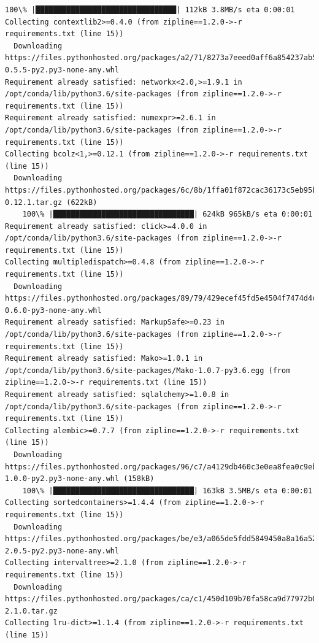 \documentclass[11pt]{article}
\begin{document}
\begin{Verbatim}[commandchars=\\\{\}]
    100\% |████████████████████████████████| 112kB 3.8MB/s eta 0:00:01
Collecting contextlib2>=0.4.0 (from zipline==1.2.0->-r requirements.txt (line 15))
  Downloading https://files.pythonhosted.org/packages/a2/71/8273a7eeed0aff6a854237ab5453bc9aa67deb49df4832801c21f0ff3782/contextlib2-0.5.5-py2.py3-none-any.whl
Requirement already satisfied: networkx<2.0,>=1.9.1 in /opt/conda/lib/python3.6/site-packages (from zipline==1.2.0->-r requirements.txt (line 15))
Requirement already satisfied: numexpr>=2.6.1 in /opt/conda/lib/python3.6/site-packages (from zipline==1.2.0->-r requirements.txt (line 15))
Collecting bcolz<1,>=0.12.1 (from zipline==1.2.0->-r requirements.txt (line 15))
  Downloading https://files.pythonhosted.org/packages/6c/8b/1ffa01f872cac36173c5eb95b58c01040d8d25f1b242c48577f4104cd3ab/bcolz-0.12.1.tar.gz (622kB)
    100\% |████████████████████████████████| 624kB 965kB/s eta 0:00:01
Requirement already satisfied: click>=4.0.0 in /opt/conda/lib/python3.6/site-packages (from zipline==1.2.0->-r requirements.txt (line 15))
Collecting multipledispatch>=0.4.8 (from zipline==1.2.0->-r requirements.txt (line 15))
  Downloading https://files.pythonhosted.org/packages/89/79/429ecef45fd5e4504f7474d4c3c3c4668c267be3370e4c2fd33e61506833/multipledispatch-0.6.0-py3-none-any.whl
Requirement already satisfied: MarkupSafe>=0.23 in /opt/conda/lib/python3.6/site-packages (from zipline==1.2.0->-r requirements.txt (line 15))
Requirement already satisfied: Mako>=1.0.1 in /opt/conda/lib/python3.6/site-packages/Mako-1.0.7-py3.6.egg (from zipline==1.2.0->-r requirements.txt (line 15))
Requirement already satisfied: sqlalchemy>=1.0.8 in /opt/conda/lib/python3.6/site-packages (from zipline==1.2.0->-r requirements.txt (line 15))
Collecting alembic>=0.7.7 (from zipline==1.2.0->-r requirements.txt (line 15))
  Downloading https://files.pythonhosted.org/packages/96/c7/a4129db460c3e0ea8fea0c9eb5de6680d38ea6b6dcffcb88898ae42e170a/alembic-1.0.0-py2.py3-none-any.whl (158kB)
    100\% |████████████████████████████████| 163kB 3.5MB/s eta 0:00:01
Collecting sortedcontainers>=1.4.4 (from zipline==1.2.0->-r requirements.txt (line 15))
  Downloading https://files.pythonhosted.org/packages/be/e3/a065de5fdd5849450a8a16a52a96c8db5f498f245e7eda06cc6725d04b80/sortedcontainers-2.0.5-py2.py3-none-any.whl
Collecting intervaltree>=2.1.0 (from zipline==1.2.0->-r requirements.txt (line 15))
  Downloading https://files.pythonhosted.org/packages/ca/c1/450d109b70fa58ca9d77972b02f69222412f9175ccf99fdeaf167be9583c/intervaltree-2.1.0.tar.gz
Collecting lru-dict>=1.1.4 (from zipline==1.2.0->-r requirements.txt (line 15))

\end{Verbatim}
\end{document}
